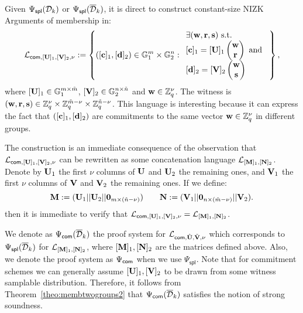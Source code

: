 Given ${\Psi_{\mathsf{spl}}(\mathcal{D}_k)}$ or ${\Psi_\mathsf{spl}(\overline{\mathcal{D}}_k)}$, it is direct to construct constant-size NIZK Arguments of membership in:
$$\mathcal{L}_{\mathsf{com},[\mathbf{{U}}]_1,[\mathbf{{V}}]_2,\nu}:=\left\{([\mathbf{c}]_1,[\mathbf{d}]_2) \in \mathbb{G}_1^{m} \times \mathbb{G}_2^{n}:
\begin{array}{l}
    \exists (\mathbf{w},\mathbf{r},\mathbf{s}) \text{ s.t. }\\
    {[\mathbf{c}]_1= [\mathbf{{U}}]_1 \begin{pmatrix} \mathbf{w}\\ \mathbf{r} \end{pmatrix} \text{ and }}\\
    {[\mathbf{d}]_2=[\mathbf{{V}}]_2 \begin{pmatrix} \mathbf{w} \\ \mathbf{s} \end{pmatrix}}
\end{array}
\right\},$$
where $[\mathbf{{U}}]_1\in \mathbb{G}_1^{m \times \tilde{m}}$, 
$[\mathbf{{V}}]_2 \in \mathbb{G}_2^{n \times \tilde{n}}$
and $\mathbf{w} \in \mathbb{Z}_q^{\nu}$. The witness is 
 $(\mathbf{w},\mathbf{r},\mathbf{s}) \in \mathbb{Z}_q^{\nu} \times \mathbb{Z}_q^{\tilde{m}-\nu} \times \mathbb{Z}_q^{\tilde{n}-\nu}$. This language is interesting because it can express the fact that 
$([\mathbf{c}]_1,[\mathbf{d}]_2)$ are commitments to the same vector 
$\mathbf{w} \in \mathbb{Z}_q^{\nu}$ in different groups.
 
The construction is an immediate consequence of the observation 
that $\mathcal{L}_{\mathsf{com},[\mathbf{{U}}]_1,[\mathbf{{V}}]_2,\nu}$  can be rewritten as some concatenation language $\mathcal{L}_{[\mathbf{{M}}]_1,[\mathbf{{N}}]_2}$.
Denote by $\mathbf{{U}}_1$ the first $\nu$ columns of $\mathbf{{U}}$  and $\mathbf{{U}}_2$ the remaining ones, and $\mathbf{{V}}_1$ the first $\nu$ columns of $\mathbf{{V}}$ and $\mathbf{{V}}_2$ the remaining ones. If we define: 
\begin{equation*}
 \mathbf{{M}} := (\mathbf{{U}}_1||\mathbf{{U}}_2||\mathbf{{0}}_{m\times (\tilde{n}-\nu)}) \qquad
\mathbf{{N}} := (\mathbf{{V}}_1||\mathbf{{0}}_{n\times (\tilde{m}- \nu)}||\mathbf{{V}}_2).
\end{equation*}
then it is immediate to verify that $\mathcal{L}_{\mathsf{com},[\mathbf{{U}}]_1,[\mathbf{{V}}]_2,\nu}=\mathcal{L}_{[\mathbf{{M}}]_1,[\mathbf{{N}}]_2}$.

We denote as ${\Psi_{\mathsf{com}}(\overline{\mathcal{D}}_k)}$ the proof 
system for $\mathcal{L}_{\mathsf{com},{\hat{\mathbf{{U}}}},\check{\mathbf{{V}}},\nu}$ which corresponds to ${\Psi_\mathsf{spl}(\overline{\mathcal{D}}_k)}$ for $\mathcal{L}_{[\mathbf{{M}}]_1,[\mathbf{{N}}]_2}$, where $[\mathbf{{M}}]_1,[\mathbf{{N}}]_2$ are the matrices defined above. Also, we denote the proof system as $\Psi_{\mathsf{com}}$ when we use $\Psi_\mathsf{spl}$. Note that for commitment schemes we can generally assume $[\mathbf{{U}}]_1,[\mathbf{{V}}]_2$ to be drawn from some witness samplable distribution. Therefore, it follows from Theorem~\ref{theo:membtwogroups2} that ${\Psi_{\mathsf{com}}(\overline{\mathcal{D}}_k)}$ satisfies the notion of strong soundness.  
